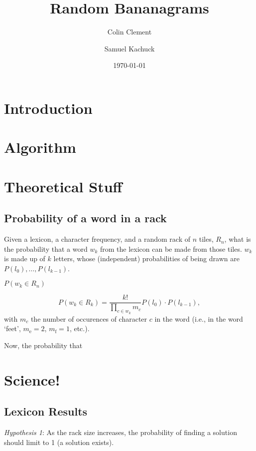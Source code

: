 \documentclass[twocolumn]{revtex4}
\begin{document}
\title{Random Bananagrams}

\author{Colin Clement}
\author{Samuel Kachuck}

\date{\today}

\begin{abstract}
\end{abstract}

\maketitle

\section{Introduction}

\section{Algorithm}

\section{Theoretical Stuff}
\subsection{Probability of a word in a rack}
Given a lexicon, a character frequency, and a random rack of $n$ tiles, $R_n$, what is the probability that a word $w_k$ from the lexicon can be made from those tiles. $w_k$ is made up of $k$ letters, whose (independent) probabilities of being drawn are $P(l_0),\ldots,P(l_{k-1})$.

$P(w_k \in R_n)$

\begin{equation}
P(w_k \in R_k) = \frac{k!}{\prod_{c\in w_k} m_c} P(l_0)\cdot P(l_{k-1}),
\end{equation}
with $m_c$ the number of occurences of character $c$ in the word (i.e., in the word `feet', $m_\text{e} = 2$, $m_\text{f}=1$, etc.).

Now, the probability that 


\section{Science!}
\subsection{Lexicon Results}
\emph{Hypothesis 1}: As the rack size increases, the probability of finding a solution should limit to 1 (a solution exists).
\end{document}
